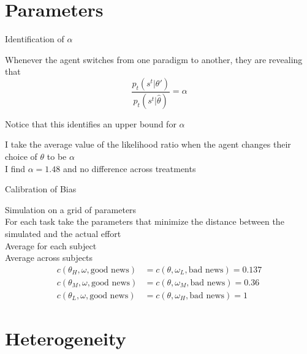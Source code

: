 \documentclass[aspectratio=169]{beamer}
\begin{document}
\section*{Parameters}

\begin{frame}{Identification of $\alpha$}

    Whenever the agent switches from one paradigm to another, they are revealing that \\
    $$\frac{p_t(s^t|\theta')}{p_t(s^t|\hat{\theta})}=\alpha$$

    \bigskip
    Notice that this identifies an upper bound for $\alpha$\\
    \bigskip

    I take the average value of the likelihood ratio when the agent changes their choice of $\theta$
    to be $\alpha $\\
    \bigskip
    I find $\alpha=1.48$ and no difference across treatments\\


\end{frame}

\begin{frame}{Calibration of Bias}
    
    Simulation on a grid of parameters\\
    \bigskip
    For each task take the parameters that minimize the distance between the simulated and the actual effort\\
    \bigskip
    Average for each subject\\
    \bigskip
    Average across subjects\\
    
    \begin{align*}
        c(\theta_H, \omega, \text{good news}) & =  c(\theta, \omega_L, \text{bad news})= 0.137\\
        c(\theta_M, \omega, \text{good news}) & =  c(\theta, \omega_M, \text{bad news}) = 0.36\\
        c(\theta_L, \omega, \text{good news}) & =  c(\theta, \omega_H, \text{bad news}) = 1
    \end{align*}
    
\end{frame}

\section*{Heterogeneity}
\end{document}
